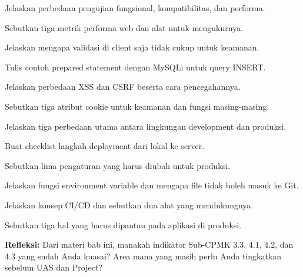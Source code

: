 \documentclass[../main.tex]{subfiles}
\begin{document}
\begin{latihan}
  \item Jelaskan perbedaan pengujian fungsional, kompatibilitas, dan performa.
  \item Sebutkan tiga metrik performa web dan alat untuk mengukurnya.
  \item Jelaskan mengapa validasi di client saja tidak cukup untuk keamanan.
  \item Tulis contoh prepared statement dengan MySQLi untuk query INSERT.
  \item Jelaskan perbedaan XSS dan CSRF beserta cara pencegahannya.
  \item Sebutkan tiga atribut cookie untuk keamanan dan fungsi masing-masing.
  \item Jelaskan tiga perbedaan utama antara lingkungan development dan produksi.
  \item Buat checklist langkah deployment dari lokal ke server.
  \item Sebutkan lima pengaturan  yang harus diubah untuk produksi.
  \item Jelaskan fungsi environment variable dan mengapa file  tidak boleh masuk ke Git.
  \item Jelaskan konsep CI/CD dan sebutkan dua alat yang mendukungnya.
  \item Sebutkan tiga hal yang harus dipantau pada aplikasi di produksi.
  \item \textbf{Refleksi:} Dari materi bab ini, manakah indikator Sub-CPMK 3.3, 4.1, 4.2, dan 4.3 yang sudah Anda kuasai? Area mana yang masih perlu Anda tingkatkan sebelum UAS dan Project?
\end{latihan}
\end{document}
